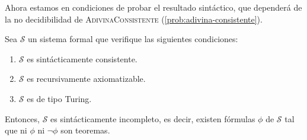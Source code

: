 Ahora estamos en condiciones de probar el resultado sintáctico, que dependerá de la no decidibilidad de \textsc{AdivinaConsistente} (\cref{prob:adivina-consistente}). \cite{Aaronson2017}

\pagebreak

\begin{teorema}\label{teo:incompletitud-sintactica}
Sea $\mathcal{S}$ un sistema formal que verifique las siguientes condiciones:
\begin{enumerate}[label=(\arabic*)]
    \item $\mathcal{S}$ es sintácticamente consistente.
    \item $\mathcal{S}$ es recursivamente axiomatizable.
    \item $\mathcal{S}$ es de tipo Turing.
\end{enumerate}
Entonces, $\mathcal{S}$ es sintácticamente incompleto, es decir, existen fórmulas $\phi$ de $\mathcal{S}$ tal que ni $\phi$ ni $\neg\phi$ son teoremas.
\end{teorema}
